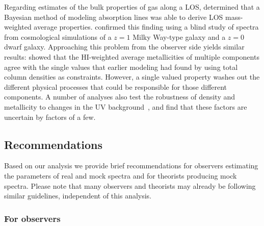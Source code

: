 \documentclass[fleqn,usenatbib]{mnras}
\begin{document}
Regarding estimates of the bulk properties of gas along a LOS,
\cite{liang2018Observing} determined that a Bayesian method of modeling absorption lines was able to derive LOS  mass-weighted average properties.
\cite{marra2021.cosmo.sims.test.observational.modeling} confirmed this finding using a blind study of spectra from cosmological simulations of a $z=1$ Milky Way-type galaxy and a $z=0$ dwarf galaxy.
Approaching this problem from the observer side yields similar results:
\cite{sameer2021Cloudbycloud} showed that the HI-weighted average metallicities of multiple components agree with the single values that earlier modeling had found by using total column densities as constraints.
However, a single valued property washes out the different physical processes that could be responsible for those different components.
A number of analyses also \cite{acharya2021How} test the robustness of density and metallicity to changes in the UV background~\citep[][]{Wotta2016, Wotta2019, acharya2021How}, and find that these factors are uncertain by factors of a few.

\subsection{Recommendations}

Based on our analysis we provide brief recommendations for observers estimating the parameters of real and mock spectra and for theorists producing mock spectra.
Please note that many observers and theorists may already be following similar guidelines, 
independent of this analysis.

\subsubsection{For observers}
\end{document}
